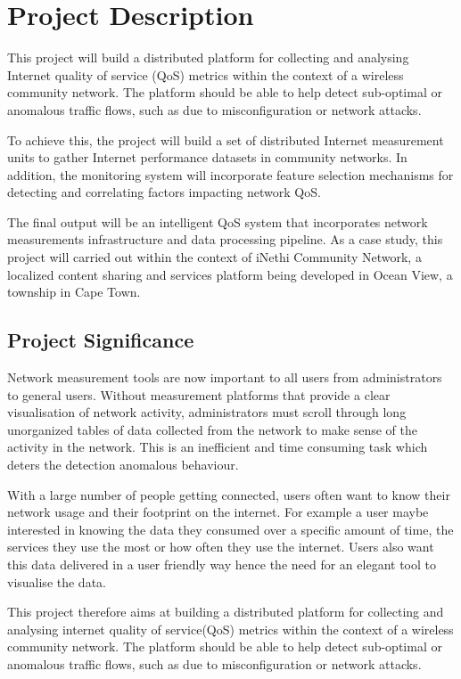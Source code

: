  \section{Project Description}
This project will build a distributed platform for collecting and analysing Internet quality of service (QoS) metrics within the context of a wireless community network. The platform should be able to help detect sub-optimal or anomalous traffic flows, such as due to misconfiguration or network attacks.

To achieve this, the project will build a set of distributed Internet measurement units to gather Internet performance datasets in community networks. In addition, the monitoring system will incorporate feature selection mechanisms for detecting and correlating factors impacting network QoS.

The final output will be an intelligent QoS system that incorporates network measurements infrastructure and data processing pipeline. As a case study, this project will carried out within the context of iNethi Community Network, a localized content sharing and services platform being developed in Ocean View, a township in Cape Town.


\subsection{Project Significance}
Network measurement tools are now important to all users from administrators to general users. Without measurement platforms that provide a clear visualisation of network activity, administrators must scroll through long unorganized tables of data collected from the network to make sense of the activity in the network. This is an inefficient and time consuming task which deters the detection anomalous behaviour.

With a large number of people getting connected, users often want to know their network usage and their footprint on the internet. For example a user maybe interested in knowing the data they consumed over a specific amount of time, the services they use the most or how often they use the internet. Users also want this data delivered in a user friendly way hence the need for an elegant tool to visualise the data.

This project therefore aims at building a distributed platform for collecting and analysing internet quality of service(QoS) metrics within the context of a wireless community network. The platform should be able to help detect sub-optimal or anomalous traffic flows, such as due to misconfiguration or network attacks.

